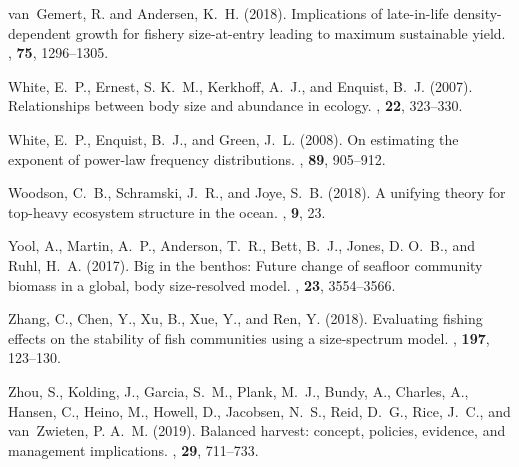 \begin{thebibliography}{}
{van~Gemert}, R. and Andersen, K.~H. ({2018}).
\newblock Implications of late-in-life density-dependent growth for fishery
  size-at-entry leading to maximum sustainable yield.
, {\bf 75}, 1296--1305.

White, E.~P., Ernest, S. K.~M., Kerkhoff, A.~J., and Enquist, B.~J. (2007).
\newblock Relationships between body size and abundance in ecology.
, {\bf 22}, 323--330.

White, E.~P., Enquist, B.~J., and Green, J.~L. (2008).
\newblock On estimating the exponent of power-law frequency distributions.
, {\bf 89}, 905--912.

Woodson, C.~B., Schramski, J.~R., and Joye, S.~B. (2018).
\newblock A unifying theory for top-heavy ecosystem structure in the ocean.
, {\bf 9}, 23.

Yool, A., Martin, A.~P., Anderson, T.~R., Bett, B.~J., Jones, D. O.~B., and
  Ruhl, H.~A. (2017).
\newblock Big in the benthos: Future change of seafloor community biomass in a
  global, body size-resolved model.
, {\bf 23}, 3554--3566.

Zhang, C., Chen, Y., Xu, B., Xue, Y., and Ren, Y. (2018).
\newblock Evaluating fishing effects on the stability of fish communities using
  a size-spectrum model.
, {\bf 197}, 123--130.

Zhou, S., Kolding, J., Garcia, S.~M., Plank, M.~J., Bundy, A., Charles, A.,
  Hansen, C., Heino, M., Howell, D., Jacobsen, N.~S., Reid, D.~G., Rice, J.~C.,
  and {van~Zwieten}, P. A.~M. (2019).
\newblock Balanced harvest: concept, policies, evidence, and management
  implications.
, {\bf 29}, 711--733.

\end{thebibliography}


\clearpage


